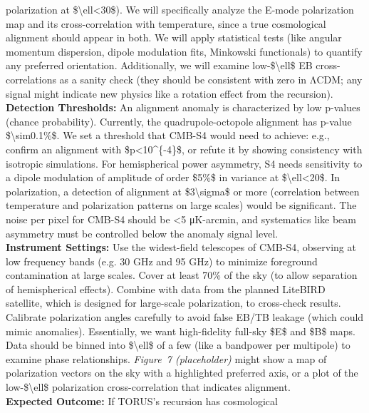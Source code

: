 \documentclass[]{article}
\begin{document}
\begin{enumerate}
  polarization at \$\textbackslash{}ell\textless{}30\$)​. We will
  specifically analyze the E-mode polarization map and its
  cross-correlation with temperature, since a true cosmological
  alignment should appear in both​. We will apply statistical tests
  (like angular momentum dispersion, dipole modulation fits, Minkowski
  functionals) to quantify any preferred orientation. Additionally, we
  will examine low-\$\textbackslash{}ell\$ EB cross-correlations as a
  sanity check (they should be consistent with zero in ΛCDM; any signal
  might indicate new physics like a rotation effect from the
  recursion).\\
  \textbf{Detection Thresholds:} An alignment anomaly is characterized
  by low p-values (chance probability). Currently, the
  quadrupole-octopole alignment has p-value
  \$\textbackslash{}sim0.1\%\$​. We set a threshold that CMB-S4 would
  need to achieve: e.g., confirm an alignment with
  \$p\textless{}10\^{}\{-4\}\$, or refute it by showing consistency with
  isotropic simulations. For hemispherical power asymmetry, S4 needs
  sensitivity to a dipole modulation of amplitude of order \$5\%\$ in
  variance at \$\textbackslash{}ell\textless{}20\$. In polarization, a
  detection of alignment at \$3\textbackslash{}sigma\$ or more
  (correlation between temperature and polarization patterns on large
  scales) would be significant. The noise per pixel for CMB-S4 should be
  \textless{}5 μK-arcmin, and systematics like beam asymmetry must be
  controlled below the anomaly signal level.\\
  \textbf{Instrument Settings:} Use the widest-field telescopes of
  CMB-S4, observing at low frequency bands (e.g. 30 GHz and 95 GHz) to
  minimize foreground contamination at large scales. Cover at least 70\%
  of the sky (to allow separation of hemispherical effects). Combine
  with data from the planned LiteBIRD satellite, which is designed for
  large-scale polarization, to cross-check results. Calibrate
  polarization angles carefully to avoid false EB/TB leakage (which
  could mimic anomalies). Essentially, we want high-fidelity full-sky
  \$E\$ and \$B\$ maps. Data should be binned into
  \$\textbackslash{}ell\$ of a few (like a bandpower per multipole) to
  examine phase relationships. \emph{Figure~7 (placeholder)} might show
  a map of polarization vectors on the sky with a highlighted preferred
  axis, or a plot of the low-\$\textbackslash{}ell\$ polarization
  cross-correlation that indicates alignment.\\
  \textbf{Expected Outcome:} If TORUS's recursion has cosmological

\end{enumerate}
\end{document}

